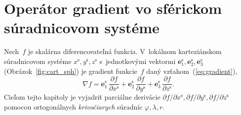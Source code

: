 \documentclass[a4paper, 12pt]{book}
\let\vec\mathbf
\begin{document}
\section{Operátor gradient vo sférickom súradnicovom systéme}
\label{app:gradient_in_spherical_coordinates}

Nech~$f$ je skalárna diferencovateľná funkcia.  V~lokálnom karteziánskom 
súradnicovom systéme $x^{\mathrm{s}}, y^{\mathrm{s}}, z^{\mathrm{s}}$ 
s~jednotkovými vektormi $\vec e^\mathrm{s}_1, \vec e^\mathrm{s}_2, \vec 
e^\mathrm{s}_3$ (Obrázok~\ref{fig:cart_sph}) je gradient funkcie~$f$ daný 
vzťahom~(\ref{eq:gradient}),
%
\begin{equation}
\nabla f = \vec e^\mathrm{s}_1 \, \frac{\partial f}{\partial x^{\mathrm{s}}} 
+ \vec e^\mathrm{s}_2 \, \frac{\partial f}{\partial y^{\mathrm{s}}} + \vec 
e^\mathrm{s}_3 \, \frac{\partial f}{\partial z^{\mathrm{s}}}{.}
\end{equation}
%
Cieľom tejto kapitoly je vyjadriť parciálne derivácie $\partial f \slash 
\partial x^{\mathrm{s}}, \partial f \slash \partial y^{\mathrm{s}}, \partial 
f \slash \partial z^{\mathrm{s}}$ pomocou ortogonálnych \emph{krivočiarych} 
súradníc $\varphi, \lambda, r$.
\end{document}
